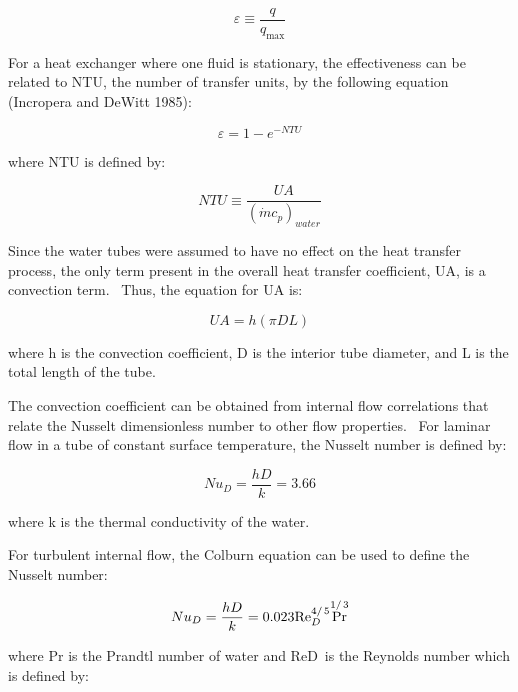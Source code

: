 \begin{equation}
\varepsilon  \equiv \frac{q}{{{q_{\max }}}}
\end{equation}

For a heat exchanger where one fluid is stationary, the effectiveness can be related to NTU, the number of transfer units, by the following equation (Incropera and DeWitt 1985):

\begin{equation}
\varepsilon  = 1 - {e^{ - NTU}}
\end{equation}

where NTU is defined by:

\begin{equation}
NTU \equiv \frac{{UA}}{{{{\left( {\dot m{c_p}} \right)}_{water}}}}
\end{equation}

Since the water tubes were assumed to have no effect on the heat transfer process, the only term present in the overall heat transfer coefficient, UA, is a convection term.~ Thus, the equation for UA is:

\begin{equation}
UA = h\left( {\pi DL} \right)
\end{equation}

where h is the convection coefficient, D is the interior tube diameter, and L is the total length of the tube.

The convection coefficient can be obtained from internal flow correlations that relate the Nusselt dimensionless number to other flow properties.~ For laminar flow in a tube of constant surface temperature, the Nusselt number is defined by:

\begin{equation}
N{u_D} = \frac{{hD}}{k} = 3.66
\end{equation}

where k is the thermal conductivity of the water.

For turbulent internal flow, the Colburn equation can be used to define the Nusselt number:

\begin{equation}
N{u_D} = \frac{{hD}}{k} = 0.023{\mathop{\rm Re}\nolimits}_D^{{4 \mathord{\left/ {\vphantom {4 5}} \right. } 5}}{\Pr ^{{1 \mathord{\left/ {\vphantom {1 3}} \right. } 3}}}
\end{equation}

where Pr is the Prandtl number of water and ReD~is the Reynolds number which is defined by:


